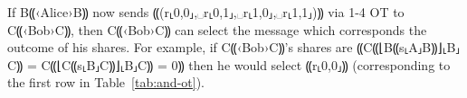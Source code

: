 \documentclass{report}
\newcommand{\alice}{B⸨‹Alice›B⸩\xspace}
\newcommand{\bob}{C⸨‹Bob›C⸩\xspace}
\newcommand{\alices}[1]{B⸨#1⸤A⸥B⸩}
\newcommand{\bobs}[1]{C⸨#1⸤B⸥C⸩}
\newcommand{\aliceSec}{\alices{s}\xspace}
\newcommand{\bobSec}{\bobs{s}\xspace}
\newcommand{\bobSh}[1]{\bobs{⌊#1⌋}}
\begin{document}
If \alice now sends ⸨(r⸤0,0⸥,␣r⸤0,1⸥,␣r⸤1,0⸥,␣r⸤1,1⸥)⸩ via 1-4 OT to \bob, then \bob can select the message which corresponds the outcome
of his shares. For example, if \bob's shares are ⸨\bobSh{\aliceSec} = \bobSh{\bobSec} = 0⸩ then he would select ⸨r⸤0,0⸥⸩ (corresponding
to the first row in Table~\ref{tab:and-ot}).
\end{document}
